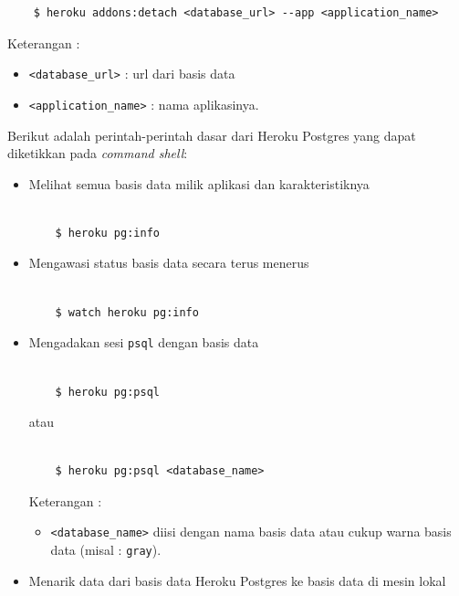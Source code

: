 \documentclass[a4paper,twoside]{article}
\begin{document}
\begin{enumerate}
\begin{enumerate}
\begin{itemize}
\begin{lstlisting}
	$ heroku addons:detach <database_url> --app <application_name>

\end{lstlisting}
Keterangan :
\begin{itemize}
\item \texttt{<database\_url>} : url dari basis data
\item \texttt{<application\_name>} : nama aplikasinya.
\end{itemize}

Berikut adalah perintah-perintah dasar dari Heroku Postgres yang dapat diketikkan pada \textit{command shell}:
\begin{itemize}
\item Melihat semua basis data milik aplikasi dan karakteristiknya

\begin{lstlisting}

	$ heroku pg:info

\end{lstlisting}

\item Mengawasi status basis data secara terus menerus

\begin{lstlisting}

	$ watch heroku pg:info

\end{lstlisting}

\item Mengadakan sesi \texttt{psql} dengan basis data

\begin{lstlisting}

	$ heroku pg:psql

\end{lstlisting}
atau
\begin{lstlisting}

	$ heroku pg:psql <database_name>

\end{lstlisting}
Keterangan :
\begin{itemize}
\item \texttt{<database\_name>} diisi dengan nama basis data atau cukup warna basis data (misal : \texttt{gray}).
\end{itemize}

\item Menarik data dari basis data Heroku Postgres ke basis data di mesin lokal

\begin{lstlisting}


\end{lstlisting}
\end{itemize}
\end{itemize}
\end{enumerate}
\end{enumerate}
\end{document}
